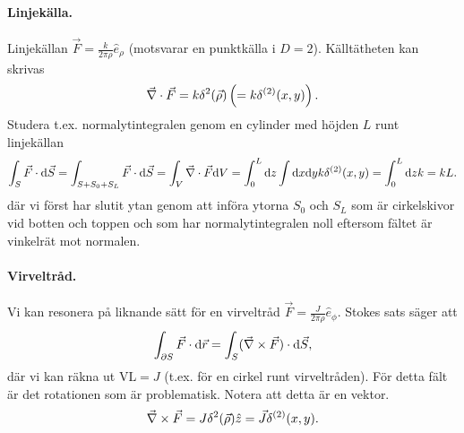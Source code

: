 \documentclass[%
oneside,                 %
final,                   %
10pt]{article}
\begin{document}
\paragraph{Linjekälla.}
Linjekällan $\vec{F} = \frac{k}{2 \pi \rho} \hat{e}_\rho$ (motsvarar en punktkälla i $D=2$).
Källtätheten kan skrivas
$$
\vec{\nabla} \cdot \vec{F} = k \delta^2(\vec{\rho}) \left( = k \delta^{(2)}(x,y) \right).
$$
Studera t.ex. normalytintegralen genom en cylinder med höjden $L$ runt linjekällan
$$
\int_S \vec{F} \cdot \mbox{d}\vec{S} = \int_{S+S_0+S_L} \vec{F} \cdot \mbox{d}\vec{S} = \int_V \vec{\nabla} \cdot \vec{F} \mbox{d} V = \int_0^L \mbox{d} z \int \mbox{d}x \mbox{d}y k \delta^{(2)}(x,y) = \int_0^L \mbox{d} z k = k L.
$$
där vi först har slutit ytan genom att införa ytorna $S_0$ och $S_L$ som är cirkelskivor vid botten och toppen och som har normalytintegralen noll eftersom fältet är vinkelrät mot normalen.

\paragraph{Virveltråd.}
Vi kan resonera på liknande sätt för en virveltråd $\vec{F} = \frac{J}{2 \pi \rho} \hat{e}_\phi$. Stokes sats säger att
$$
\int_{\partial S} \vec{F} \cdot \mbox{d} \vec{r} = \int_S (\vec{\nabla} \times \vec{F}) \cdot \mbox{d} \vec{S},
$$
där vi kan räkna ut $\mathrm{VL} = J$ (t.ex. för en cirkel runt virveltråden). För detta fält är det rotationen som är problematisk. Notera att detta är en vektor.
$$
\vec{\nabla} \times \vec{F} = J \delta^2(\vec{\rho}) \hat{z} = \vec{J} \delta^{(2)}(x,y).
$$
\end{document}
